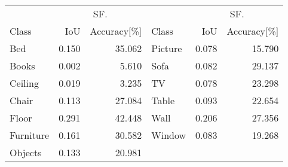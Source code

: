 \begin{tabular}{lrr|lrr}
\toprule
 &  \multicolumn{2}{c|}{SF.} &&  \multicolumn{2}{c}{SF.}   \\
Class     &      IoU        &    Accuracy[\%] &  Class     &      IoU        &    Accuracy[\%]  \\
\midrule
Bed       &           0.150 & 35.062&Picture   &           0.078 & 15.790 \\
Books     &           0.002 &  5.610&Sofa      &           0.082 & 29.137 \\
Ceiling   &           0.019 &  3.235&TV        &           0.078 & 23.298 \\
Chair     &           0.113 & 27.084&Table     &           0.093 & 22.654 \\
Floor     &           0.291 & 42.448&Wall      &           0.206 & 27.356 \\
Furniture &           0.161 & 30.582&Window    &           0.083 & 19.268 \\
Objects   &           0.133 & 20.981& &&\\

\bottomrule
\end{tabular}
